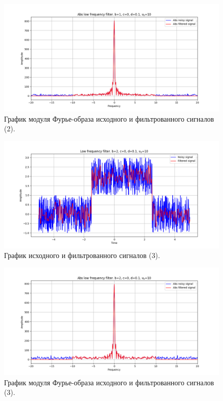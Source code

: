 \documentclass[a4paper, 12pt]{article}
\begin{document}
    \begin{figure}[!htb]
        \centering
        \includegraphics[scale=0.48]{2_abs_u_U_nohigh.png}
        \captionsetup{skip=0pt}
        \caption{График модуля Фурье-образа исходного и фильтрованного сигналов (2).}
        \label{fig:fig4}
    \end{figure}
    \begin{figure}[!htb]
        \centering
        \includegraphics[scale=0.48]{3_u_flt_u_nohigh.png}
        \captionsetup{skip=0pt}
        \caption{График исходного и фильтрованного сигналов (3).}
        \label{fig:fig5}
    \end{figure}
    \begin{figure}[!htb]
        \centering
        \includegraphics[scale=0.48]{3_abs_u_U_nohigh.png}
        \captionsetup{skip=0pt}
        \caption{График модуля Фурье-образа исходного и фильтрованного сигналов (3).}
        \label{fig:fig6}
    \end{figure}
\end{document}
